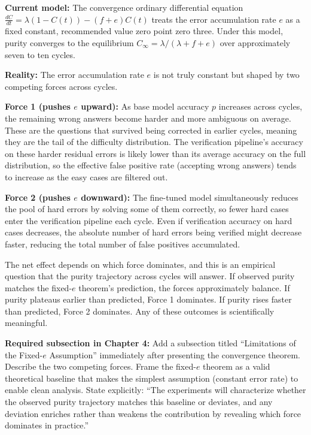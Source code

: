 \documentclass[11pt,a4paper]{article}
\newcommand{\theorybox}[2]{%
\begin{tcolorbox}[enhanced,breakable,
  colback=LightForest,colframe=ForestGreen,boxrule=1.5pt,arc=4pt,
  left=8pt,right=8pt,top=6pt,bottom=6pt,
  title={\bfseries\small\color{white}#1},
  attach boxed title to top left={yshift=-2mm,xshift=6mm},
  boxed title style={colback=ForestGreen,arc=3pt,boxrule=0pt,
    left=4pt,right=4pt,top=2pt,bottom=2pt}]
#2
\end{tcolorbox}}
\begin{document}
\theorybox{THEORY UPDATE 2: Limitations of Fixed-$e$ Assumption in Convergence Theorem}{
\textbf{Current model:} The convergence ordinary differential equation $\frac{dC}{dt} = \lambda(1 - C(t)) - (f + e)C(t)$ treats the error accumulation rate $e$ as a fixed constant, recommended value zero point zero three. Under this model, purity converges to the equilibrium $C_\infty = \lambda / (\lambda + f + e)$ over approximately seven to ten cycles.

\textbf{Reality:} The error accumulation rate $e$ is not truly constant but shaped by two competing forces across cycles.

\textbf{Force 1 (pushes $e$ upward):} As base model accuracy $p$ increases across cycles, the remaining wrong answers become harder and more ambiguous on average. These are the questions that survived being corrected in earlier cycles, meaning they are the tail of the difficulty distribution. The verification pipeline's accuracy on these harder residual errors is likely lower than its average accuracy on the full distribution, so the effective false positive rate (accepting wrong answers) tends to increase as the easy cases are filtered out.

\textbf{Force 2 (pushes $e$ downward):} The fine-tuned model simultaneously reduces the pool of hard errors by solving some of them correctly, so fewer hard cases enter the verification pipeline each cycle. Even if verification accuracy on hard cases decreases, the absolute number of hard errors being verified might decrease faster, reducing the total number of false positives accumulated.

The net effect depends on which force dominates, and this is an empirical question that the purity trajectory across cycles will answer. If observed purity matches the fixed-$e$ theorem's prediction, the forces approximately balance. If purity plateaus earlier than predicted, Force 1 dominates. If purity rises faster than predicted, Force 2 dominates. Any of these outcomes is scientifically meaningful.

\textbf{Required subsection in Chapter 4:} Add a subsection titled ``Limitations of the Fixed-$e$ Assumption'' immediately after presenting the convergence theorem. Describe the two competing forces. Frame the fixed-$e$ theorem as a valid theoretical baseline that makes the simplest assumption (constant error rate) to enable clean analysis. State explicitly: ``The experiments will characterize whether the observed purity trajectory matches this baseline or deviates, and any deviation enriches rather than weakens the contribution by revealing which force dominates in practice.''

}
\end{document}
